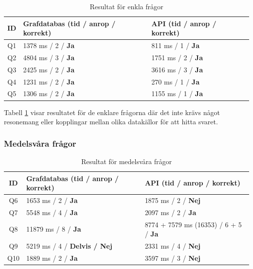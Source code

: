 \begin{table}[H]
\centering
\begin{tabular}{|c|l|l|}
\hline
\rowcolor{blue!25}
\textbf{ID} & \textbf{Grafdatabas (tid / anrop / korrekt)} & \textbf{API (tid / anrop / korrekt)} \\
\hline
Q1 & 1378 ms / 2 / \textcolor{green!60!black}{\textbf{Ja}} & 811 ms / 1 / \textcolor{green!60!black}{\textbf{Ja}} \\
\rowcolor{gray!12}
Q2 & 4804 ms / 3 / \textcolor{green!60!black}{\textbf{Ja}} & 1751 ms / 2 / \textcolor{green!60!black}{\textbf{Ja}} \\
Q3 & 2425 ms / 2 / \textcolor{green!60!black}{\textbf{Ja}} & 3616 ms / 3 / \textcolor{green!60!black}{\textbf{Ja}} \\
\rowcolor{gray!12}
Q4 & 1231 ms / 2 / \textcolor{green!60!black}{\textbf{Ja}} & 270 ms / 1 / \textcolor{green!60!black}{\textbf{Ja}} \\
Q5 & 1306 ms / 2 / \textcolor{green!60!black}{\textbf{Ja}} & 1155 ms / 1 / \textcolor{green!60!black}{\textbf{Ja}} \\
\hline
\end{tabular}
\caption{Resultat för enkla frågor}
\label{tab:simple}
\end{table}

Tabell \ref{tab:simple} visar resultatet för de enklare frågorna där det inte krävs något resonemang eller kopplingar mellan olika datakällor för att hitta svaret.

\subsubsection{Medelsvåra frågor}\label{subsubsec:medelsvaraResult}

\begin{table}[h]
\centering
\begin{tabular}{|c|l|l|}
\hline
\rowcolor{blue!25}
\textbf{ID} & \textbf{Grafdatabas (tid / anrop / korrekt)} & \textbf{API (tid / anrop / korrekt)} \\
\hline
Q6  & 1653 ms / 2 / \textcolor{green!60!black}{\textbf{Ja}} & 1875 ms / 2 / \textcolor{red!70!black}{\textbf{Nej}} \\
\rowcolor{gray!12}
Q7  & 5548 ms / 4 / \textcolor{green!60!black}{\textbf{Ja}} & 2097 ms / 2 / \textcolor{green!60!black}{\textbf{Ja}} \\
Q8  & 11879 ms / 8 / \textcolor{green!60!black}{\textbf{Ja}} & 8774 + 7579 ms (16353) / 6 + 5 / \textcolor{green!60!black}{\textbf{Ja}} \\
\rowcolor{gray!12}
Q9  & 5219 ms / 4 / \textcolor{orange!80!black}{\textbf{Delvis / Nej}} & 2331 ms / 4 / \textcolor{red!70!black}{\textbf{Nej}} \\
Q10 & 1889 ms / 2 / \textcolor{green!60!black}{\textbf{Ja}} & 3597 ms / 3 / \textcolor{red!70!black}{\textbf{Nej}} \\
\hline
\end{tabular}
\caption{Resultat för medelsvåra frågor}
\label{tab:medelsvara}
\end{table}

